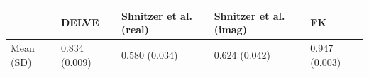 \begin{tabular}{lllll}
\toprule
 & DELVE & Shnitzer et al. (real) & Shnitzer et al. (imag) & FK \\
\midrule
Mean (SD) & 0.834 (0.009) & 0.580 (0.034) & 0.624 (0.042) & 0.947 (0.003) \\
\bottomrule
\end{tabular}
